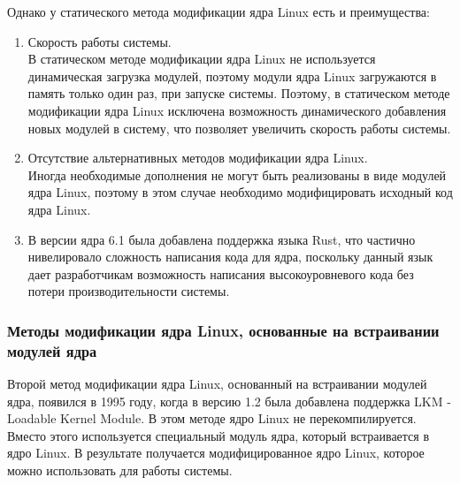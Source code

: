 Однако у статического метода модификации ядра Linux есть и преимущества:

\begin{enumerate}
    \item Скорость работы системы. \vspace{1mm}\\
    В статическом методе модификации ядра Linux не используется динамическая загрузка модулей, поэтому модули ядра Linux загружаются в память только один раз, при запуске системы.
    Поэтому, в статическом методе модификации ядра Linux исключена возможность динамического добавления новых модулей в систему, что позволяет увеличить скорость работы системы.
    \item Отсутствие альтернативных методов модификации ядра Linux.\vspace{1mm}\\
    Иногда необходимые дополнения не могут быть реализованы в виде модулей ядра Linux, поэтому в этом случае необходимо модифицировать исходный код ядра Linux.
    \item В версии ядра 6.1 была добавлена поддержка языка Rust, что частично нивелировало сложность написания кода для ядра, поскольку данный язык дает разработчикам возможность написания высокоуровневого кода без потери производительности системы.
\end{enumerate}

\subsubsection{Методы модификации ядра Linux, основанные на встраивании модулей ядра}\label{subsec:---linux-----}

Второй метод модификации ядра Linux, основанный на встраивании модулей ядра, появился в 1995 году, когда в версию 1.2 была добавлена поддержка LKM - Loadable Kernel Module.
В этом методе ядро Linux не перекомпилируется.
Вместо этого используется специальный модуль ядра, который встраивается в ядро Linux.
В результате получается модифицированное ядро Linux, которое можно использовать для работы системы.

